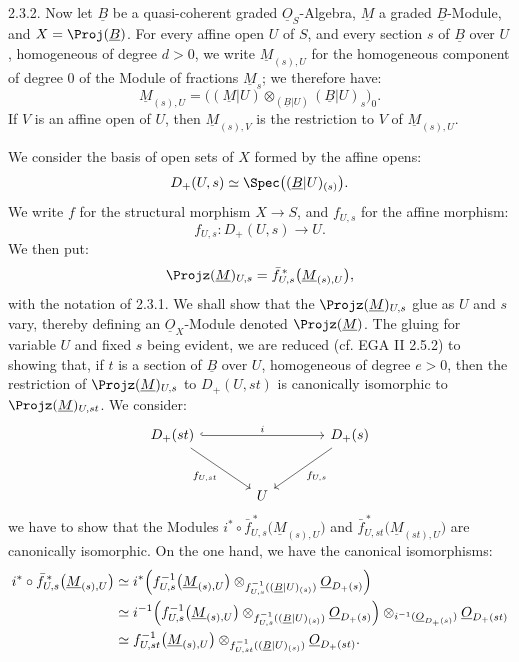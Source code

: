 2.3.2. Now let \(\underline{B}\) be a quasi-coherent graded \(\underline{O}_S\)-Algebra, \(\underline{M}\) a graded \(\underline{B}\)-Module, and \(X=\Proj(\underline{B})\). For every affine open \(U\) of \(S\), and every section \(s\) of \(\underline{B}\) over \(U\), homogeneous of degree \(d>0\), we write \(\underline{M}_{(s),U}\) for the homogeneous component of degree \(0\) of the Module of fractions \(\underline{M}_s\); we therefore have:
\[
  \underline{M}_{(s),U}=
  \bigl((\underline{M}|U)\otimes_{(\underline{B}|U)}(\underline{B}|U)_s\bigr)_0 .
\]
If \(V\) is an affine open of \(U\), then \(\underline{M}_{(s),V}\) is the restriction to \(V\) of \(\underline{M}_{(s),U}\).

We consider the basis of open sets of \(X\) formed by the affine opens:
\[
  D_+(U,s)\simeq \Spec\bigl((\underline{B}|U)_{(s)}\bigr) .
\]
We write \(f\) for the structural morphism \(X\to S\), and \(f_{U,s}\) for the affine morphism:
\[
  f_{U,s}:D_+(U,s)\longrightarrow U .
\]
We then put:
\[
  \Projz(\underline{M})_{U,s}
  =
  \bar f_{U,s}^{\,*}\bigl(\underline{M}_{(s),U}\bigr),
\]
with the notation of 2.3.1. We shall show that the \(\Projz(\underline{M})_{U,s}\) glue as \(U\) and \(s\) vary, thereby defining an \(\underline{O}_X\)-Module denoted \(\Projz(\underline{M})\). The gluing for variable \(U\) and fixed \(s\) being evident, we are reduced (cf. EGA II 2.5.2) to showing that, if \(t\) is a section of \(\underline{B}\) over \(U\), homogeneous of degree \(e>0\), then the restriction of \(\Projz(\underline{M})_{U,s}\) to \(D_+(U,st)\) is canonically isomorphic to \(\Projz(\underline{M})_{U,st}\). We consider:
%
\[
\begin{tikzcd}[column sep=large,row sep=large]
D_+(st) \arrow[rr,hook,"i"] \arrow[dr,"f_{U,st}"'] & &
D_+(s) \arrow[dl,"f_{U,s}"]\\
& U &
\end{tikzcd}
\]
we have to show that the Modules \(i^*\circ\bar f_{U,s}^{\,*}\bigl(\underline{M}_{(s),U}\bigr)\) and \(\bar f_{U,st}^{\,*}\bigl(\underline{M}_{(st),U}\bigr)\)
are canonically isomorphic. On the one hand, we have the canonical isomorphisms:
\[
\begin{aligned}
i^*\circ\bar f_{U,s}^{\,*}\bigl(\underline{M}_{(s),U}\bigr)
&\simeq
i^*\Bigl(f_{U,s}^{-1}\bigl(\underline{M}_{(s),U}\bigr)
 \otimes_{f_{U,s}^{-1}((\underline{B}|U)_{(s)})}\underline{O}_{D_+(s)}\Bigr)\\
&\simeq
i^{-1}\Bigl(f_{U,s}^{-1}\bigl(\underline{M}_{(s),U}\bigr)
 \otimes_{f_{U,s}^{-1}((\underline{B}|U)_{(s)})}\underline{O}_{D_+(s)}\Bigr)
 \otimes_{i^{-1}(\underline{O}_{D_+(s)})}\underline{O}_{D_+(st)}\\
&\simeq
f_{U,st}^{-1}\bigl(\underline{M}_{(s),U}\bigr)
 \otimes_{f_{U,st}^{-1}((\underline{B}|U)_{(s)})}\underline{O}_{D_+(st)} .
\end{aligned}
\]
